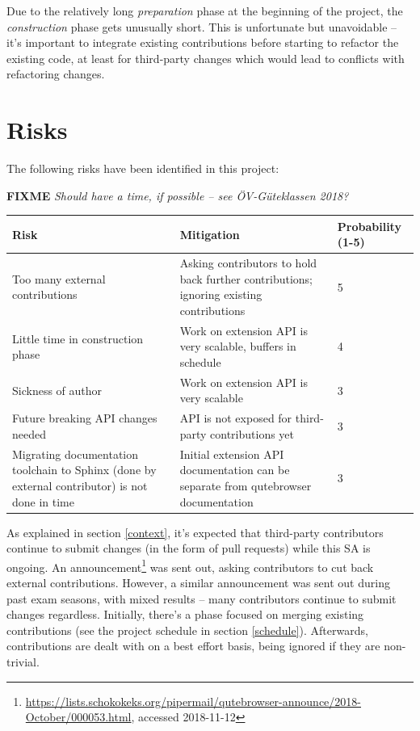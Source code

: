 \documentclass[a4paper,parskip=full]{scrreprt}
\newcommand{\fixme}[1]{\textbf{FIXME} \emph{#1}}
\begin{document}
Due to the relatively long \emph{preparation} phase at the beginning of the
project, the \emph{construction} phase gets unusually short. This is
unfortunate but unavoidable -- it's important to integrate existing
contributions before starting to refactor the existing code, at least for
third-party changes which would lead to conflicts with refactoring changes.

\section{Risks}
The following risks have been identified in this project:

\fixme{Should have a time, if possible -- see ÖV-Güteklassen 2018?}

\begin{table}[h!]
  \begin{tabulary}{\linewidth}{LLL}
    \toprule
    Risk & Mitigation & Probability (1-5) \\
    \midrule
    Too many external contributions & Asking contributors to hold back further contributions; ignoring existing contributions & 5 \\
    \hline
    Little time in construction phase & Work on extension API is very
    scalable, buffers in schedule & 4 \\
    \hline
    Sickness of author & Work on extension API is very scalable & 3 \\
    \hline
    Future breaking API changes needed & API is not exposed for third-party
    contributions yet & 3 \\
    \hline
    Migrating documentation toolchain to Sphinx (done by external contributor)
    is not done in time & Initial extension API documentation can be separate from
    qutebrowser documentation & 3 \\
    \bottomrule
  \end{tabulary}
\end{table}

As explained in section \ref{context}, it's expected that third-party
contributors continue to submit changes (in the form of pull requests) while
this SA is ongoing. An
announcement\footnote{\url{https://lists.schokokeks.org/pipermail/qutebrowser-announce/2018-October/000053.html},
  accessed 2018-11-12} was sent out, asking contributors to cut back external
contributions. However, a similar announcement was sent out during past exam
seasons, with mixed results -- many contributors continue to submit changes
regardless. Initially, there's a phase focused on merging existing
contributions (see the project schedule in section \ref{schedule}). Afterwards,
contributions are dealt with on a best effort basis, being ignored if they
are non-trivial.
\end{document}
